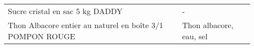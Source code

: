 \begin{longtable}{p{5cm}p{10cm}}
                                                                          Sucre cristal en sac 5 kg DADDY &                                                                                                                                                                                                                                                                                                                                                                                                                                                                                                                                                                                                                                                                                                                                                                                                                                                                                                                                                                                                                                        - \\
                                                Thon Albacore entier au naturel en boîte 3/1 POMPON ROUGE &                                                                                                                                                                                                                                                                                                                                                                                                                                                                                                                                                                                                                                                                                                                                                                                                                                                                                                                                                                                                                  Thon albacore, eau, sel \\

\end{longtable}
